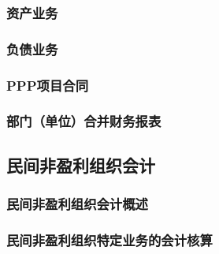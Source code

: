 \documentclass[UTF8,12pt]{ctexart}
\numberwithin{equation}{section} %
\numberwithin{figure}{section}
\numberwithin{table}{section}
\begin{document}
	\subsubsection{资产业务}
	\subsubsection{负债业务}
	\subsubsection{PPP项目合同}
	\subsubsection{部门（单位）合并财务报表}
	
	\subsection{民间非盈利组织会计}
	\subsubsection{民间非盈利组织会计概述}
	\subsubsection{民间非盈利组织特定业务的会计核算}
		
\end{document}
